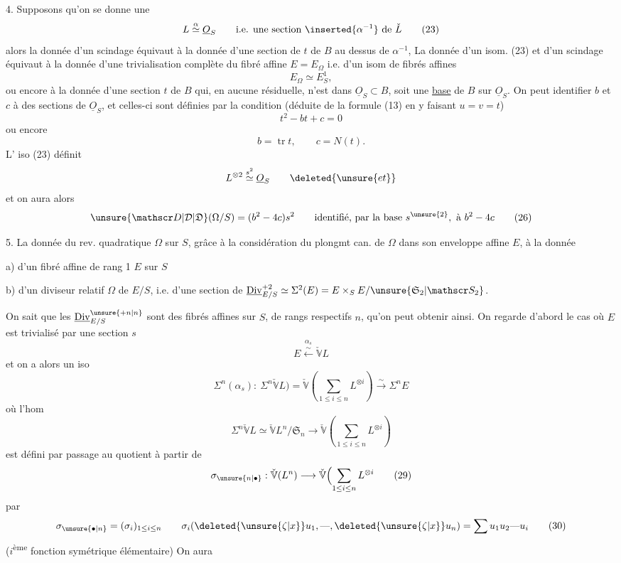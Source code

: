 4. Supposons qu'on se donne une 
\[
L\overset{\alpha}{\simeq}\underline{O}_S\qquad\text{i.e. une section }\inserted{\alpha^{-1}}\text{ de }\check L \tag*{(23)}
\]
alors la donnée d'un scindage équivaut
à la donnée d'une section de $t$ de $B$ au
dessus de $\alpha^{-1}$, La donnée d'un isom. (23)
et d'un scindage équivaut à la donnée d'une
trivialisation complète du fibré affine $E=E_\Omega$
i.e. d'un isom de fibrés affines
\[
E_\Omega\simeq E^1_S,
\]
ou encore à la donnée d'une section
$t$ de $B$ qui, en aucune  résiduelle,
n'est dans $\underline{O}_S\subset B$, 
soit une \uline{base} de $B$ sur $\underline{O}_S$. On peut  identifier
$b$ et $c$ à des sections de $\underline{O}_S$, et celles-ci
sont définies par la condition (déduite de la
 formule (13) en y faisant $u=v=t$)
\[
t^2-bt+c=0 \tag*{(24)}
\]
ou encore
\[
b=\operatorname{tr}t,\qquad c=N(t).\tag*{(25)}
\]
L' iso (23) définit 
\[
 L^{\otimes2}\overset{s^2}{\simeq}\underline{O}_S\qquad\deleted{\unsure{et}}
\]
et  on aura alors
\[
\unsure{\mathscr D|\mathcal D|\mathfrak D}(\Omega/S)=(b^2-4c)s^2\qquad
\text{identifié, par la base }s^{\unsure{2}},\text{ à }b^2-4c \tag*{(26)}
\]


5. La donnée du \deleted{\unsure{$\Omega$}} rev. quadratique $\Omega$ sur $S$,
grâce à la considération du plongmt can. de
$\Omega$ dans son enveloppe affine $E$,  à la donnée

a) d'un fibré affine de rang 1 $E$ sur $S$

b) d'un diviseur relatif  $\Omega$ de $E/S$,
i.e. d'une section de $\underline{\mathrm{Div}}^{+2}_{E/S}\simeq\Sigma^2(E)=E\times_S E/\unsure{\mathfrak S_2|\mathscr S_2}$.

On sait que  les $\underline{\mathrm{Div}}^{\unsure{+n|n}}_{E/S}$ 
sont des fibrés affines sur $S$, de rangs respectifs $n$, qu'on peut
obtenir ainsi. On regarde d'abord le cas où $E$
est trivialisé par une section $s$
\[
E\overset{\alpha_s}{\xleftarrow{\sim}}\check{\mathbb V}L \tag*{(27)}
\]
et on a alors un iso
\[
\Sigma^n(\alpha_s):\ \Sigma^n\check{\mathbb V}L)=\check{\mathbb V}\left(\sum_{1\le i\le n}L^{\otimes i}\right)\xrightarrow{\sim}\Sigma^n E
\]
où l'hom
\[
\Sigma^n\check{\mathbb V}L\simeq\check{\mathbb V}L^n/\mathfrak S_n\longrightarrow
 \check{\mathbb V}\left(\sum_{1\le i\le n}L^{\otimes i}\right) \tag*{(28)}
\]
est défini par passage au quotient à partir de
\[
\sigma_{\unsure{n|\bullet}}:\check{\mathbb V}(L^n)\longrightarrow
 \check{\mathbb V}\Bigl(\sum_{1\le i\le n}L^{\otimes i} \tag*{(29)}
\]
 par
\[
\sigma_{\unsure{\bullet|n}}=(\sigma_i)_{1\le i\le n}\qquad
\sigma_i(\deleted{\unsure{\zeta|x}}u_1,\text{---},\deleted{\unsure{\zeta|x}}u_n)=\sum u_1 u_2\text{---}u_i \tag*{(30)}
\]
($i$\textsuperscript{ème} fonction symétrique élémentaire) On aura

